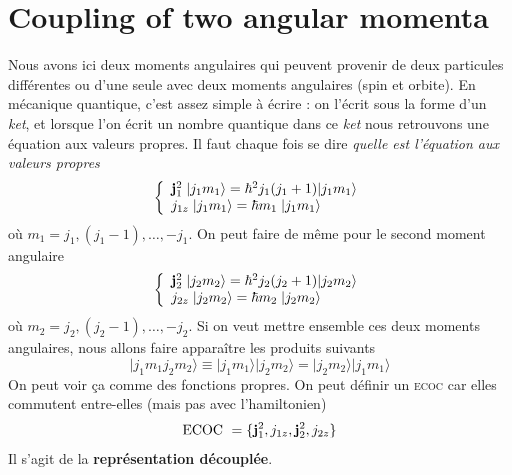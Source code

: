 \section{Coupling of two  angular momenta}
Nous avons ici deux moments angulaires qui peuvent provenir de deux particules différentes ou
d'une seule avec deux moments angulaires (spin et orbite). En mécanique quantique, c'est assez
simple à écrire : on l'écrit sous la forme d'un \textit{ket}, et lorsque l'on écrit un nombre
quantique dans ce \textit{ket} nous retrouvons une équation aux valeurs propres. Il faut chaque
fois se dire \textit{quelle est l'équation aux valeurs propres}
\begin{equation}
\left\{ \begin{array}{l}
{\bf j}_1^2 \; \vert j_1 m_1 \rangle  =  \hbar^2 j_1(j_1 + 1) \vert j_1 m_1 \rangle \\
j_{1z} \; \vert j_1 m_1 \rangle  =  \hbar m_1 \;\vert j_1 m_1 \rangle  
 \end{array} \right.
\end{equation}
où $m_1 = j_1, (j_1-1), \ldots, -j_1$. On peut faire de même pour le second moment angulaire
\begin{equation}
\left\{ \begin{array}{l}
{\bf j}_2^2 \; \vert j_2 m_2 \rangle  =  \hbar^2 j_2(j_2 + 1) \vert j_2 m_2 \rangle \\
j_{2z} \; \vert j_2 m_2 \rangle  =  \hbar m_2 \;\vert j_2 m_2 \rangle  
 \end{array} \right.
\end{equation}
où $m_2 = j_2, (j_2-1), \ldots, -j_2$. Si on veut mettre ensemble ces deux moments angulaires, 
nous allons faire apparaître les produits suivants
\begin{equation}
\vert j_1 m_1 j_2 m_2  \rangle \equiv 
\vert j_1 m_1 \rangle \vert j_2 m_2 \rangle 
= \vert j_2 m_2 \rangle  \vert j_1 m_1 \rangle
\end{equation}
On peut voir ça comme des fonctions propres. On peut définir un \textsc{ecoc} car elles commutent
entre-elles (mais pas avec l'hamiltonien)
\begin{equation}
\mbox{ECOC}~ = \{ {\bf j}_1^2, j_{1z}, {\bf j}_2^2, j_{2z} \}
\end{equation}
Il s'agit de la \textbf{représentation découplée}.\\


